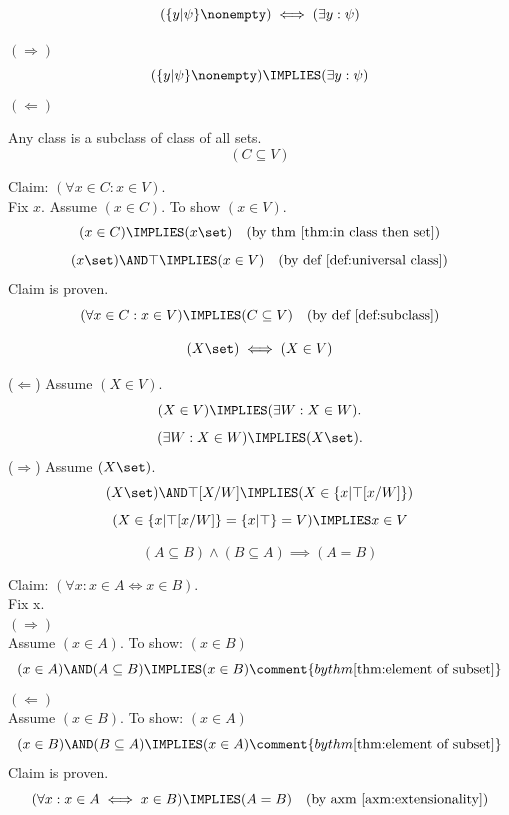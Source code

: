\def\topic{}


\iftrue
\begin{theorem}
\[
(\{y|\psi\}\nonempty)
\iff
(\exists y:\psi)
\]
\end{theorem}
\Proof
\noindent$(\Rightarrow)$\\
\[
(\{y|\psi\}\nonempty)
\IMPLIES
(\exists y:\psi)
\]
\noindent$(\Leftarrow)$\\
\Done
\fi

\begin{theorem}
Any class is a subclass of class of all sets.
\[(C\subseteq V)\]
\end{theorem}
\Proof
Claim: $(\forall x\in C:x\in V)$.\\
Fix $x$. Assume $(x\in C)$. To show $(x\in V)$.
\[
(x\in C)
\IMPLIES
(x\set)
\quad\mbox{(by thm \ref{thm:in class then set})}
\]
\[
(x\set)
\AND
\top
\IMPLIES
(x\in V)
\quad\mbox{(by def \ref{def:universal class})}
\]
Claim is proven.
\[
(\forall x\in C:x\in V)
\IMPLIES
(C\subseteq V)
\quad\mbox{(by def \ref{def:subclass})}
\]
\Done

\begin{theorem}
\label{thm:sets are in V}
\[
(X\set)\iff(X\in V)
\]
\end{theorem}
\Proof
\noindent($\Leftarrow$) Assume $(X\in V)$.
\[
(X\in V)\IMPLIES(\exists W: X\in W).
\]
\[
(\exists W: X\in W)\IMPLIES(X\set).
\]
\noindent($\Rightarrow$) Assume $(X\set)$.
\[
(X\set)\AND\top[X/W]\IMPLIES(X\in \{x|\top[x/W]\})
\]
\[
(X\in \{x|\top[x/W]\}=\{x|\top\}=V)\IMPLIES x\in V
\]
\Done
\begin{theorem}
\[
(A \subseteq B)\land (B\subseteq A) \implies (A=B)
\]
\end{theorem}
\Proof
Claim: $(\forall x:x\in A \iff x\in B)$.\\
Fix x.\\
$(\Rightarrow)$\\
Assume $(x\in A)$. To show: $(x\in B)$\\
\[
(x\in A)
\AND
(A\subseteq B)
\IMPLIES
(x\in B)
\comment{by thm \ref{thm:element of subset}}
\]
$(\Leftarrow)$\\
Assume $(x\in B)$. To show: $(x\in A)$\\
\[
(x\in B)
\AND
(B\subseteq A)
\IMPLIES
(x\in A)
\comment{by thm \ref{thm:element of subset}}
\]
Claim is proven.
\[
(\forall x:x\in A \iff x\in B)
\IMPLIES
(A=B)
\quad\mbox{(by axm \ref{axm:extensionality})}
\]
\Done


